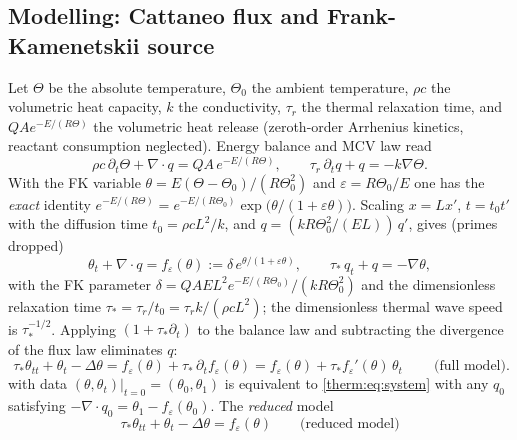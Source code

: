 \subsection{Modelling: Cattaneo flux and Frank-Kamenetskii source}
\label{therm:sec:model}

Let $\Theta$ be the absolute temperature, $\Theta_0$ the ambient temperature,
$\rho c$ the volumetric heat capacity, $k$ the conductivity, $\tau_r$ the thermal
relaxation time, and $Q A e^{-E/(R\Theta)}$ the volumetric heat release
(zeroth-order Arrhenius kinetics, reactant consumption neglected).  Energy
balance and MCV law read
\begin{equation}\label{therm:eq:phys}
  \rho c\,\partial_t\Theta+\nabla\!\cdot q=QA\,e^{-E/(R\Theta)},\qquad
  \tau_r\,\partial_t q+q=-k\nabla\Theta .
\end{equation}
With the FK variable $\theta=E(\Theta-\Theta_0)/(R\Theta_0^2)$ and
$\varepsilon=R\Theta_0/E$ one has the \emph{exact} identity
$e^{-E/(R\Theta)}=e^{-E/(R\Theta_0)}\exp\bigl(\theta/(1+\varepsilon\theta)\bigr)$.
Scaling $x=Lx'$, $t=t_0t'$ with the diffusion time $t_0=\rho cL^2/k$, and
$q=(kR\Theta_0^2/(EL))\,q'$, gives (primes dropped)
\begin{equation}\label{therm:eq:system}
  \theta_t+\nabla\!\cdot q=f_\varepsilon(\theta):=\delta\,e^{\theta/(1+\varepsilon\theta)},\qquad
  \tau_*\, q_t+q=-\nabla\theta,
\end{equation}
with the FK parameter $\delta=QAEL^2e^{-E/(R\Theta_0)}/(kR\Theta_0^2)$ and the
dimensionless relaxation time $\tau_*=\tau_r/t_0=\tau_rk/(\rho cL^2)$; the
dimensionless thermal wave speed is $\tau_*^{-1/2}$.  Applying $(1+\tau_*\partial_t)$ to
the balance law and subtracting the divergence of the flux law eliminates $q$:
\begin{equation}\label{therm:eq:full}
  \boxed{\ \tau_*\theta_{tt}+\theta_t-\Delta\theta=f_\varepsilon(\theta)+\tau_*\,\partial_t f_\varepsilon(\theta)
  =f_\varepsilon(\theta)+\tau_* f_\varepsilon'(\theta)\,\theta_t\ }\qquad\text{(full model)}.
\end{equation}
 with data $(\theta,\theta_t)|_{t=0}=(\theta_0,\theta_1)$ is
equivalent to \cref{therm:eq:system} with any $q_0$ satisfying
$-\nabla\cdot q_0=\theta_1-f_\varepsilon(\theta_0)$.  The \emph{reduced} model
\begin{equation}\label{therm:eq:reduced}
  \tau_*\theta_{tt}+\theta_t-\Delta\theta=f_\varepsilon(\theta)\qquad\text{(reduced model)}
\end{equation}
